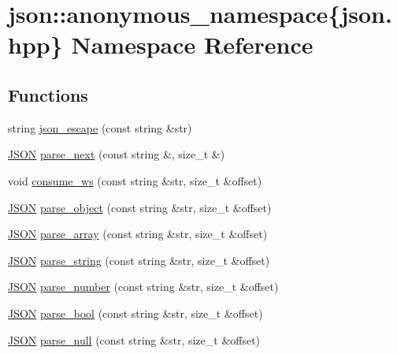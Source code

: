 \hypertarget{namespacejson_1_1anonymous__namespace_02json_8hpp_03}{}\section{json\+:\+:anonymous\+\_\+namespace\{json.\+hpp\} Namespace Reference}
\label{namespacejson_1_1anonymous__namespace_02json_8hpp_03}
\subsection*{Functions}
\begin{DoxyCompactItemize}
\item 
string \mbox{\hyperlink{namespacejson_1_1anonymous__namespace_02json_8hpp_03_a623a6fca4cd1735d2bf3d081b875a350}{json\+\_\+escape}} (const string \&str)
\item 
\mbox{\hyperlink{classjson_1_1_j_s_o_n}{J\+S\+ON}} \mbox{\hyperlink{namespacejson_1_1anonymous__namespace_02json_8hpp_03_acd55b945d1583038db8633516df7cf3f}{parse\+\_\+next}} (const string \&, size\+\_\+t \&)
\item 
void \mbox{\hyperlink{namespacejson_1_1anonymous__namespace_02json_8hpp_03_a3a6e9a9e2d1cf7848055ae69f04be8b7}{consume\+\_\+ws}} (const string \&str, size\+\_\+t \&offset)
\item 
\mbox{\hyperlink{classjson_1_1_j_s_o_n}{J\+S\+ON}} \mbox{\hyperlink{namespacejson_1_1anonymous__namespace_02json_8hpp_03_a69b6c8f8bb93130f5c6dab832000f915}{parse\+\_\+object}} (const string \&str, size\+\_\+t \&offset)
\item 
\mbox{\hyperlink{classjson_1_1_j_s_o_n}{J\+S\+ON}} \mbox{\hyperlink{namespacejson_1_1anonymous__namespace_02json_8hpp_03_a6a3598f1545d6015c9db8015fc42f7ff}{parse\+\_\+array}} (const string \&str, size\+\_\+t \&offset)
\item 
\mbox{\hyperlink{classjson_1_1_j_s_o_n}{J\+S\+ON}} \mbox{\hyperlink{namespacejson_1_1anonymous__namespace_02json_8hpp_03_a274c7a1f9001093d6b093abb5481122b}{parse\+\_\+string}} (const string \&str, size\+\_\+t \&offset)
\item 
\mbox{\hyperlink{classjson_1_1_j_s_o_n}{J\+S\+ON}} \mbox{\hyperlink{namespacejson_1_1anonymous__namespace_02json_8hpp_03_a9cc81652562c9d3c0f639ce43057f09a}{parse\+\_\+number}} (const string \&str, size\+\_\+t \&offset)
\item 
\mbox{\hyperlink{classjson_1_1_j_s_o_n}{J\+S\+ON}} \mbox{\hyperlink{namespacejson_1_1anonymous__namespace_02json_8hpp_03_ae47f0a41d47e83e2ce1f5f267e938c1e}{parse\+\_\+bool}} (const string \&str, size\+\_\+t \&offset)
\item 
\mbox{\hyperlink{classjson_1_1_j_s_o_n}{J\+S\+ON}} \mbox{\hyperlink{namespacejson_1_1anonymous__namespace_02json_8hpp_03_ad65e6ea0d2d880b099cf399600bf5666}{parse\+\_\+null}} (const string \&str, size\+\_\+t \&offset)
\end{DoxyCompactItemize}


